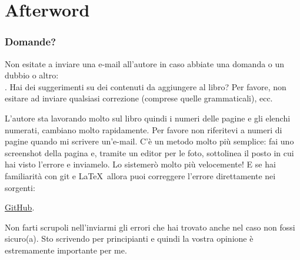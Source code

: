 \part*{Afterword}

\section{Domande?}

Non esitate a inviare una e-mail all'autore in caso abbiate una domanda o un dubbio o altro: \\
\GTT{<\EMAIL>}.
Hai dei suggerimenti su dei contenuti da aggiungere al libro?
Per favore, non esitare ad inviare qualsiasi correzione (comprese quelle grammaticali), ecc.

L'autore sta lavorando molto sul libro quindi i numeri delle pagine e gli elenchi numerati, \etc cambiano molto rapidamente.
Per favore non riferitevi a numeri di pagine quando mi scrivere un'e-mail.
C'è un metodo molto più semplice: fai uno screenshot della pagina e, tramite un editor per le foto, sottolinea il posto in cui hai visto l'errore
e inviamelo. Lo sistemerò molto più velocemente!
E se hai familiarità con git e \LaTeX\, allora puoi correggere l'errore direttamente nei sorgenti:

\href{http://go.yurichev.com/17089}{GitHub}.

Non farti scrupoli nell'inviarmi gli errori che hai trovato anche nel caso non fossi sicuro(a).
Sto scrivendo per principianti e quindi la vostra opinione è estremamente importante per me.
